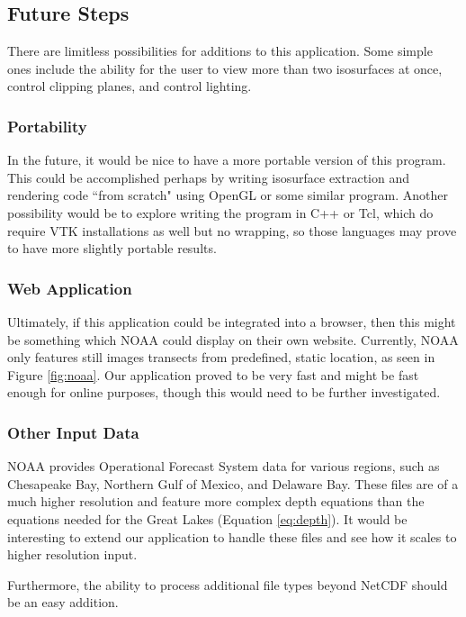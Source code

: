 \documentclass{article} %
\begin{document}
\subsection{Future Steps}

There are limitless possibilities for additions to this application.  Some simple ones include the ability for the user to view more than two isosurfaces at once, control clipping planes, and control lighting.

\subsubsection{Portability}

In the future, it would be nice to have a more portable version of this program.  This could be accomplished perhaps by writing isosurface extraction and rendering code ``from scratch" using OpenGL or some similar program.  Another possibility would be to explore writing the program in C++ or Tcl, which do require VTK installations as well but no wrapping, so those languages may prove to have more slightly portable results. 

\subsubsection{Web Application}

Ultimately, if this application could be integrated into a browser, then this might be something which NOAA could display on their own website.  Currently, NOAA only features still images transects from predefined, static location, as seen in Figure \ref{fig:noaa}.  Our application proved to be very fast and might be fast enough for online purposes, though this would need to be further investigated.

\subsubsection{Other Input Data}

NOAA provides Operational Forecast System data for various regions, such as Chesapeake Bay, Northern Gulf of Mexico, and Delaware Bay.  These files are of a much higher resolution and feature more complex depth equations than the equations needed for the Great Lakes (Equation \ref{eq:depth}).  It would be interesting to extend our application to handle these files and see how it scales to higher resolution input.

Furthermore, the ability to process additional file types beyond NetCDF should be an easy addition.





\end{document}
